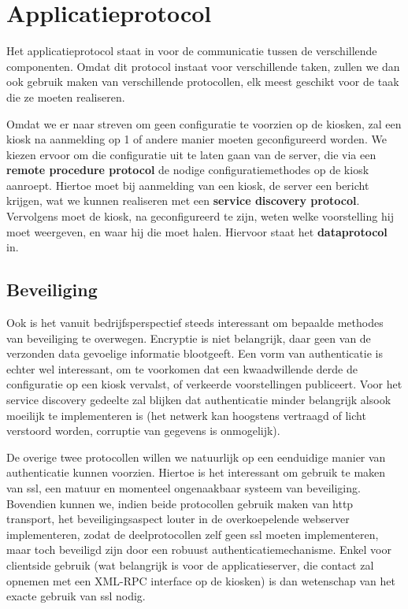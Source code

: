 \section{Applicatieprotocol}
\label{sec:applicatieprotocol}

Het applicatieprotocol staat in voor de communicatie tussen de verschillende componenten. Omdat dit protocol instaat voor verschillende taken, zullen we dan ook gebruik maken van verschillende protocollen, elk meest geschikt voor de taak die ze moeten realiseren.

Omdat we er naar streven om geen configuratie te voorzien op de kiosken, zal een kiosk na aanmelding op 1 of andere manier moeten geconfigureerd worden. We kiezen ervoor om die configuratie uit te laten gaan van de server, die via een \textbf{remote procedure protocol} de nodige configuratiemethodes op de kiosk aanroept. Hiertoe moet bij aanmelding van een kiosk, de server een bericht krijgen, wat we kunnen realiseren met een \textbf{service discovery protocol}. Vervolgens moet de kiosk, na geconfigureerd te zijn, weten welke voorstelling hij moet weergeven, en waar hij die moet halen. Hiervoor staat het \textbf{dataprotocol} in.

\subsection{Beveiliging}

Ook is het vanuit bedrijfsperspectief steeds interessant om bepaalde methodes van beveiliging te overwegen. Encryptie is niet belangrijk, daar geen van de verzonden data gevoelige informatie blootgeeft. Een vorm van authenticatie is echter wel interessant, om te voorkomen dat een kwaadwillende derde de configuratie op een kiosk vervalst, of verkeerde voorstellingen publiceert. Voor het service discovery gedeelte zal blijken dat authenticatie minder belangrijk alsook moeilijk te implementeren is (het netwerk kan hoogstens vertraagd of licht verstoord worden, corruptie van gegevens is onmogelijk).

De overige twee protocollen willen we natuurlijk op een eenduidige manier van authenticatie kunnen voorzien. Hiertoe is het interessant om gebruik te maken van \ac{ssl}, een matuur en momenteel ongenaakbaar systeem van beveiliging. Bovendien kunnen we, indien beide protocollen gebruik maken van \ac{http} transport, het beveiligingsaspect louter in de overkoepelende webserver implementeren, zodat de deelprotocollen zelf geen \ac{ssl} moeten implementeren, maar toch beveiligd zijn door een robuust authenticatiemechanisme. Enkel voor clientside gebruik (wat belangrijk is voor de applicatieserver, die contact zal opnemen met een XML-RPC interface op de kiosken) is dan wetenschap van het exacte gebruik van \ac{ssl} nodig.

